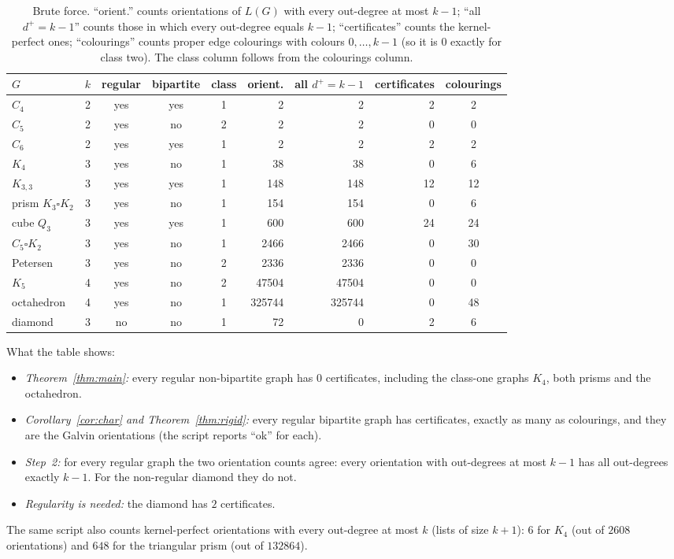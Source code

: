 \documentclass[11pt]{article}
\theoremstyle{plain}
\theoremstyle{definition}
\theoremstyle{remark}
\newcommand{\LG}{L(G)}
\newcommand{\dout}{d^{+}}
\begin{document}
\begin{table}[ht]
\centering
\small
\begin{tabular}{@{}lccccrrrc@{}}
\toprule
$G$ & $k$ & regular & bipartite & class & orient. & all $\dout=k-1$ & certificates & colourings \\
\midrule
$C_4$ & 2 & yes & yes & 1 & 2 & 2 & 2 & 2 \\
$C_5$ & 2 & yes & no & 2 & 2 & 2 & 0 & 0 \\
$C_6$ & 2 & yes & yes & 1 & 2 & 2 & 2 & 2 \\
$K_4$ & 3 & yes & no & 1 & 38 & 38 & 0 & 6 \\
$K_{3,3}$ & 3 & yes & yes & 1 & 148 & 148 & 12 & 12 \\
prism $K_3\square K_2$ & 3 & yes & no & 1 & 154 & 154 & 0 & 6 \\
cube $Q_3$ & 3 & yes & yes & 1 & 600 & 600 & 24 & 24 \\
$C_5\square K_2$ & 3 & yes & no & 1 & 2466 & 2466 & 0 & 30 \\
Petersen & 3 & yes & no & 2 & 2336 & 2336 & 0 & 0 \\
$K_5$ & 4 & yes & no & 2 & 47504 & 47504 & 0 & 0 \\
octahedron & 4 & yes & no & 1 & 325744 & 325744 & 0 & 48 \\
diamond & 3 & no & no & 1 & 72 & 0 & 2 & 6 \\
\bottomrule
\end{tabular}
\caption{Brute force. ``orient.'' counts orientations of $\LG$ with every out-degree at most
$k-1$; ``all $\dout=k-1$'' counts those in which every out-degree equals $k-1$;
``certificates'' counts the kernel-perfect ones; ``colourings'' counts proper edge colourings
with colours $0,\dots,k-1$ (so it is $0$ exactly for class two). The class column follows from
the colourings column.}
\label{tab:brute}
\end{table}

What the table shows:
\begin{itemize}
  \item \emph{Theorem~\ref{thm:main}:} every regular non-bipartite graph has $0$ certificates,
    including the class-one graphs $K_4$, both prisms and the octahedron.
  \item \emph{Corollary~\ref{cor:char} and Theorem~\ref{thm:rigid}:} every regular bipartite
    graph has certificates, exactly as many as colourings, and they are the Galvin orientations
    (the script reports ``ok'' for each).
  \item \emph{Step~2:} for every regular graph the two orientation counts agree: every
    orientation with out-degrees at most $k-1$ has all out-degrees exactly $k-1$. For the
    non-regular diamond they do not.
  \item \emph{Regularity is needed:} the diamond has $2$ certificates.
\end{itemize}
The same script also counts kernel-perfect orientations with every out-degree at most $k$
(lists of size $k+1$): $6$ for $K_4$ (out of $2608$ orientations) and $648$ for the triangular
prism (out of $132864$).
\end{document}
